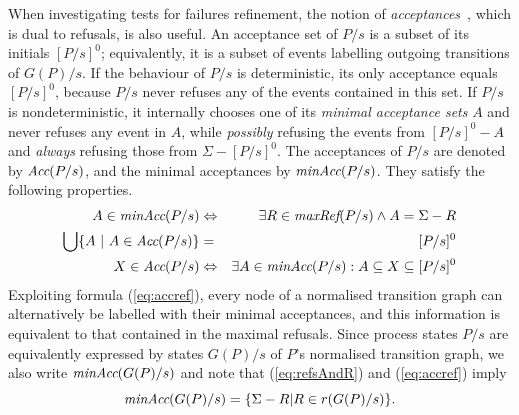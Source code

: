 When investigating  tests for failures refinement, the notion of
\emph{acceptances}~\cite{Hennessy:1988:ATP:50497}, which is dual to refusals,
is also useful. An acceptance set of $P/s$ is a subset of its initials
$[P/s]^0$; equivalently, it is a subset of events labelling  outgoing transitions of
$G(P)/s$. If the behaviour of  $P/s$ is deterministic, its only acceptance
equals $[P/s]^0$, because $P/s$ never refuses any of the events contained in
this set. If $P/s$ is nondeterministic, it internally chooses one of its
\emph{minimal acceptance sets} $A$ and never refuses any event in $A$, while
{\it possibly} refusing the events from $[P/s]^0 - A$ and
{\it always} refusing those from $\Sigma - [P/s]^0$.
The acceptances of $P/s$ are denoted by
$\text{\it Acc}(P/s)$, and the minimal acceptances by $\text{\it minAcc}(P/s)$. They satisfy
the following properties.
%
\begin{eqnarray}
A\in \text{\it minAcc}(P/s) & \Leftrightarrow & \exists R\in\text{\it maxRef}(P/s) \wedge A = \Sigma-R
\label{eq:accref}
\\
\bigcup \{ A~|~A\in \text{\it Acc}(P/s)\} & = & [P/s]^0
\label{eq:accinitials}
\\
 X\in\text{\it Acc}(P/s) &\Leftrightarrow & \exists A\in \text{\it minAcc}(P/s): A\subseteq X \subseteq [P/s]^0
 \label{eq:accsubset}
\end{eqnarray}
%
%
Exploiting formula (\ref{eq:accref}), 
every node of a normalised transition graph can
alternatively be labelled with their minimal acceptances, and this
information is equivalent to that contained in the maximal refusals. Since
process states $P/s$ are equivalently expressed by states $G(P)/s$ of $P$'s
normalised transition graph, we also write $\text{\it minAcc}(G(P)/s)$ and
note that (\ref{eq:refsAndR}) and (\ref{eq:accref}) imply
\begin{equation}\label{eq:maxrefsminaccs}
\text{\it minAcc}(G(P)/s) = \{ \Sigma - R | R\in r(G(P)/s) \}.
\end{equation}

